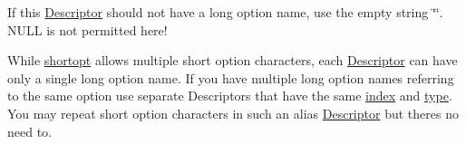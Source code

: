 If this \hyperlink{structxmem_1_1config_1_1third__party_1_1_descriptor}{Descriptor} should not have a long option name, use the empty string \char`\"{}\char`\"{}. N\+U\+L\+L is not permitted here!

While \hyperlink{structxmem_1_1config_1_1third__party_1_1_descriptor_ac2dfb6bb8ca2f4aabf964a910cf0d59b}{shortopt} allows multiple short option characters, each \hyperlink{structxmem_1_1config_1_1third__party_1_1_descriptor}{Descriptor} can have only a single long option name. If you have multiple long option names referring to the same option use separate Descriptors that have the same \hyperlink{structxmem_1_1config_1_1third__party_1_1_descriptor_aacf3d44f35c61f22be65da078f60734b}{index} and \hyperlink{structxmem_1_1config_1_1third__party_1_1_descriptor_a4b9e9a5c9b08ef575ea4f603c54bff63}{type}. You may repeat short option characters in such an alias \hyperlink{structxmem_1_1config_1_1third__party_1_1_descriptor}{Descriptor} but there\textquotesingle{}s no need to.

